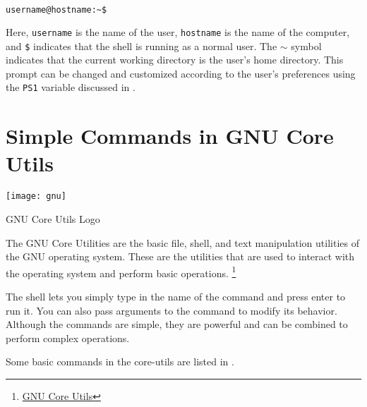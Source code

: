 \begin{lstlisting}[language=bash]
  username@hostname:~$
\end{lstlisting}

Here, \texttt{username} is the name of the user, \texttt{hostname} is the name of the computer, and \texttt{\$} indicates that the shell is running as a normal user.
The $\sim$ symbol indicates that the current working directory is the user's home directory.
 This prompt can be changed and customized according to the user's preferences using the \texttt{PS1} variable discussed in .

\vfill
\pagebreak
\section{Simple Commands in GNU Core Utils}

\begin{marginfigure}
	\texttt{[image: gnu]}
	\caption[GNU Core Utils Logo]{GNU Core Utils Logo}
\end{marginfigure}

\begin{definition}
  The GNU Core Utilities are the basic file, shell, and text manipulation utilities of the GNU operating system. These are the utilities that are used to interact with the operating system and perform basic operations.
  \footnote{
    \href{https://www.gnu.org/software/coreutils/}{GNU Core Utils}
  }
\end{definition}

The shell lets you simply type in the name of the command and press enter to run it.
You can also pass arguments to the command to modify its behavior.
Although the commands are simple, they are powerful and can be combined to perform complex operations.

Some basic commands in the core-utils are listed in .

